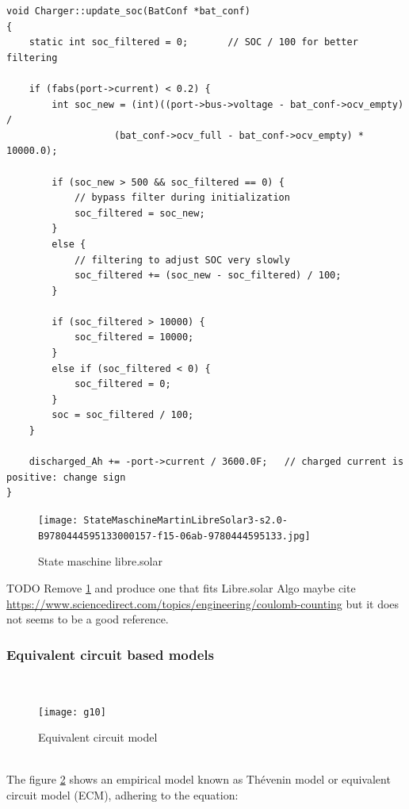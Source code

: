 \begin{verbatim}
void Charger::update_soc(BatConf *bat_conf)
{
    static int soc_filtered = 0;       // SOC / 100 for better filtering

    if (fabs(port->current) < 0.2) {
        int soc_new = (int)((port->bus->voltage - bat_conf->ocv_empty) /
                   (bat_conf->ocv_full - bat_conf->ocv_empty) * 10000.0);

        if (soc_new > 500 && soc_filtered == 0) {
            // bypass filter during initialization
            soc_filtered = soc_new;
        }
        else {
            // filtering to adjust SOC very slowly
            soc_filtered += (soc_new - soc_filtered) / 100;
        }

        if (soc_filtered > 10000) {
            soc_filtered = 10000;
        }
        else if (soc_filtered < 0) {
            soc_filtered = 0;
        }
        soc = soc_filtered / 100;
    }

    discharged_Ah += -port->current / 3600.0F;   // charged current is positive: change sign
}
\end{verbatim}



\begin{figure}
\centering
\texttt{[image: StateMaschineMartinLibreSolar3-s2.0-B9780444595133000157-f15-06ab-9780444595133.jpg]}
\caption{\label{fig:StateMaschineMartinLibreSolar3} State maschine libre.solar}
\end{figure}
TODO Remove \ref{fig:StateMaschineMartinLibreSolar3}  and produce one that fits Libre.solar Algo maybe cite \url{https://www.sciencedirect.com/topics/engineering/coulomb-counting}  but it does not seems to be a good reference. 



\pagebreak

\subsubsection{Equivalent circuit based models}
\
\
\
\begin{figure}[h!]
\begin{center}
\texttt{[image: g10]} %
\caption{\label{fig:ECMThevinModel} Equivalent circuit model }
\end{center} 
\end{figure} 
 \\
The figure \ref{fig:ECMThevinModel} shows an empirical model known as Thévenin model or equivalent circuit model (ECM), adhering to the equation: 

